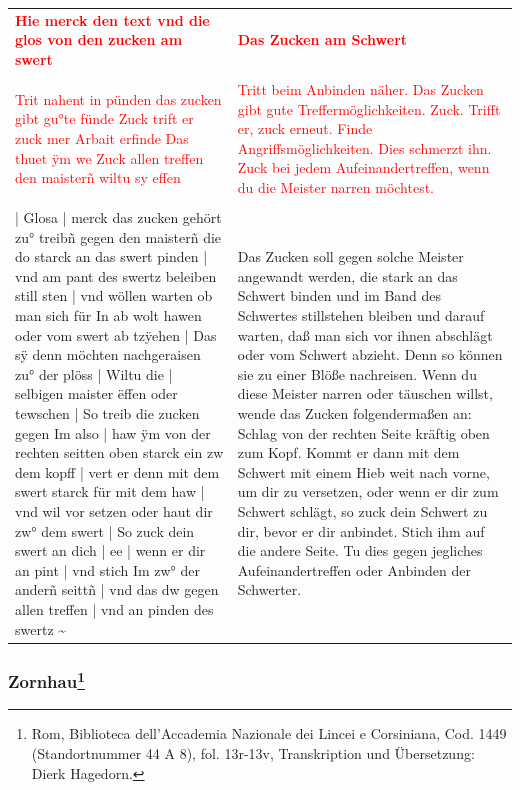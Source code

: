 \begin{longtable}{p{6.25cm}p{6.25cm}}
\textbf{\textcolor{red}{Hie merck den text vnd die glos von den zucken am swert}}
&
\textbf{\textcolor{red}{Das Zucken am Schwert}}
\\
\\
\textcolor{red}{Trit nahent in pünden das zucken gibt gu°te fünde Zuck trift er zuck mer Arbait erfinde Das thuet ÿm we Zuck allen treffen den maisterñ wiltu sy effen}
&
\textcolor{red}{Tritt beim Anbinden näher. Das Zucken gibt gute Treffermöglichkeiten. Zuck. Trifft er, zuck erneut. Finde Angriffsmöglichkeiten. Dies schmerzt ihn. Zuck bei jedem Aufeinandertreffen, wenn du die Meister narren möchtest.}
\\
\\
| Glosa | merck das zucken gehört zu° treibñ gegen den maisterñ die do starck an das swert pinden | vnd am pant des swertz beleiben still sten | vnd wöllen warten ob man sich für In ab wolt hawen oder vom swert ab tzÿehen | Das sÿ denn möchten nachgeraisen zu° der plöss | Wiltu die | selbigen maister ëffen oder tewschen | So treib die zucken gegen Im also | haw ÿm von der rechten seitten oben starck ein zw dem kopff | vert er denn mit dem swert starck für mit dem haw | vnd wil vor setzen oder haut dir zw° dem swert | So zuck dein swert an dich | ee | wenn er dir an pint | vnd stich Im zw° der anderñ seittñ | vnd das dw gegen allen treffen | vnd an pinden des swertz \textasciitilde 
&
Das Zucken soll gegen solche Meister angewandt werden, die stark an das Schwert binden und im Band des Schwertes stillstehen bleiben und darauf warten, daß man sich vor ihnen abschlägt oder vom Schwert abzieht. Denn so können sie zu einer Blöße nachreisen. Wenn du diese Meister narren oder täuschen willst, wende das Zucken folgendermaßen an: Schlag von der rechten Seite kräftig oben zum Kopf. Kommt er dann mit dem Schwert mit einem Hieb weit nach vorne, um dir zu versetzen, oder wenn er dir zum Schwert schlägt, so zuck dein Schwert zu dir, bevor er dir anbindet. Stich ihm auf die andere Seite. Tu dies gegen jegliches Aufeinandertreffen oder Anbinden der Schwerter.
\end{longtable}

\newpage

\begin{center}
\end{center}
\newpage

\subsubsection[Zornhau]{Zornhau\footnote{\hspace*{0.5ex}Rom, Biblioteca dell'Accademia Nazionale dei Lincei e Corsiniana, Cod. 1449 (Standortnummer 44 A 8), fol. 13r-13v, Transkription und Übersetzung: Dierk Hagedorn.}}

